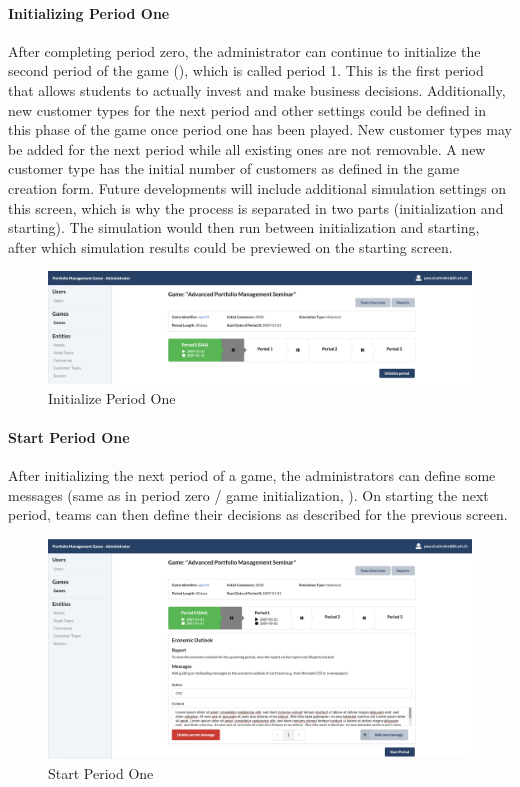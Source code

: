\paragraph{Initializing Period One}
After completing period zero, the administrator can continue to initialize the second period of the game (), which is called period 1. This is the first period that allows students to actually invest and make business decisions. Additionally, new customer types for the next period and other settings could be defined in this phase of the game once period one has been played. New customer types may be added for the next period while all existing ones are not removable. A new customer type has the initial number of customers as defined in the game creation form. Future developments will include additional simulation settings on this screen, which is why the process is separated in two parts (initialization and starting). The simulation would then run between initialization and starting, after which simulation results could be previewed on the starting screen.
\begin{figure}[h!]
  \centering
  \includegraphics[scale=0.2]{img/application-overview/administrator/08_period_initialization.png}
  \caption{Initialize Period One}
  \label{fig:initializing_period}
\end{figure}

\paragraph{Start Period One}
After initializing the next period of a game, the administrators can define some messages (same as in period zero / game initialization, ). On starting the next period, teams can then define their decisions as described for the previous screen.
\begin{figure}[h!]
  \centering
  \includegraphics[scale=0.2]{img/application-overview/administrator/09_period_start.png}
  \caption{Start Period One}
  \label{fig:starting_period_one}
\end{figure}

